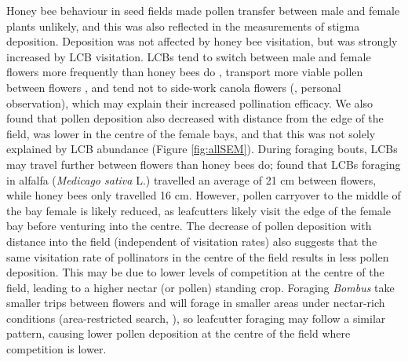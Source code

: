 \documentclass[12pt]{article} %
\begin{document}
Honey bee behaviour in seed fields made pollen transfer between male and female plants unlikely, and this was also reflected in the measurements of stigma deposition. 
Deposition was not affected by honey bee visitation, but was strongly increased by LCB visitation.
LCBs tend to switch between male and female flowers more frequently than honey bees do \citep{waytesMsc}, transport more viable pollen between flowers \citep{parker2015}, and tend not to side-work canola flowers (\citealp{soroka2001}, personal observation), which may explain their increased pollination efficacy.
We also found that pollen deposition also decreased with distance from the edge of the field, was lower in the centre of the female bays, and that this was not solely explained by LCB abundance (Figure \ref{fig:allSEM}).
During foraging bouts, LCBs may travel further between flowers than honey bees do; \citet{brunet2019} found that LCBs foraging in alfalfa (\emph{Medicago sativa} L.) travelled an average of 21 cm between flowers, while honey bees only travelled 16 cm.
However, pollen carryover \citep{thomson1986} to the middle of the bay female is likely reduced, as leafcutters likely visit the edge of the female bay before venturing into the centre.
The decrease of pollen deposition with distance into the field (independent of visitation rates) also suggests that the same visitation rate of pollinators in the centre of the field results in less pollen deposition.
This may be due to lower levels of competition at the centre of the field, leading to a higher nectar (or pollen) standing crop. %
Foraging \textit{Bombus} take smaller trips between flowers and will forage in smaller areas under nectar-rich conditions (area-restricted search, \citealp{pyke1978b, heinrich1979}), so leafcutter foraging may follow a similar pattern, causing lower pollen deposition at the centre of the field where competition is lower.
\end{document}
